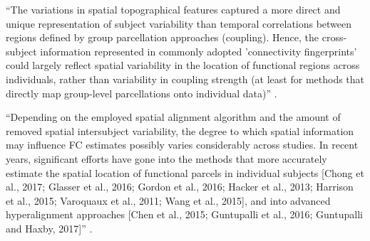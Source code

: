 %
``The variations in spatial topographical features captured a more direct and
unique representation of subject variability than temporal correlations between
regions defined by group parcellation approaches (coupling).
%
Hence, the cross-subject information represented in commonly adopted
'connectivity fingerprints' could largely reflect spatial variability in the
location of functional regions across individuals, rather than variability in
coupling strength (at least for methods that directly map group-level
parcellations onto individual data)'' \citep{bijsterbosch2018relationship}.

%
``Depending on the employed spatial alignment algorithm and the amount of
removed spatial intersubject variability, the degree to which spatial
information may influence FC estimates possibly varies considerably across
studies.
%
In recent years, significant efforts have gone into the methods that more
accurately estimate the spatial location of functional parcels in individual
subjects [Chong et al., 2017; Glasser et al., 2016; Gordon et al., 2016; Hacker
et al., 2013; Harrison et al., 2015; Varoquaux et al., 2011; Wang et al., 2015],
and into advanced hyperalignment approaches [Chen et al., 2015; Guntupalli et
al., 2016; Guntupalli and Haxby, 2017]'' \citep{bijsterbosch2018relationship}.
